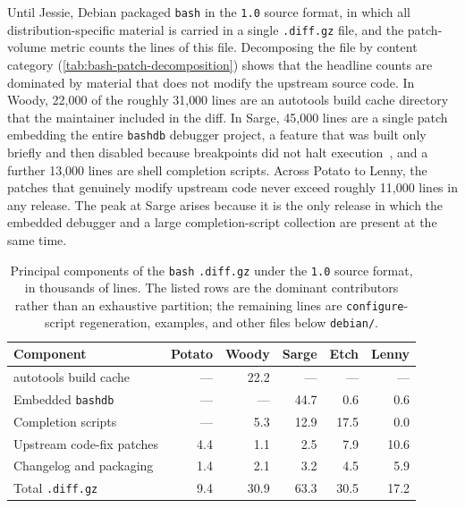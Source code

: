 Until Jessie, Debian packaged \texttt{bash} in the \texttt{1.0} source format, in which all distribution-specific material is carried in a single \texttt{.diff.gz} file, and the patch-volume metric counts the lines of this file. Decomposing the file by content category (\autoref{tab:bash-patch-decomposition}) shows that the headline counts are dominated by material that does not modify the upstream source code. In Woody, 22{,}000 of the roughly 31{,}000 lines are an autotools build cache directory that the maintainer included in the diff. In Sarge, 45{,}000 lines are a single patch embedding the entire \texttt{bashdb} debugger project, a feature that was built only briefly and then disabled because breakpoints did not halt execution~\cite{bts224573}, and a further 13{,}000 lines are shell completion scripts. Across Potato to Lenny, the patches that genuinely modify upstream code never exceed roughly 11{,}000 lines in any release. The peak at Sarge arises because it is the only release in which the embedded debugger and a large completion-script collection are present at the same time.

\begin{table}[ht]
  \centering
  \caption[Principal components of the \texttt{bash} \texttt{.diff.gz}.]{Principal components of the \texttt{bash} \texttt{.diff.gz} under the \texttt{1.0} source format, in thousands of lines. The listed rows are the dominant contributors rather than an exhaustive partition; the remaining lines are \texttt{configure}-script regeneration, examples, and other files below \texttt{debian/}.}
  \label{tab:bash-patch-decomposition}
  \begin{tabular}{lrrrrr}
    \hline
    Component & Potato & Woody & Sarge & Etch & Lenny \\
    \hline
    autotools build cache        & ---  & 22.2 & ---  & ---  & ---  \\
    Embedded \texttt{bashdb}      & ---  & ---  & 44.7 & 0.6  & 0.6  \\
    Completion scripts            & ---  & 5.3  & 12.9 & 17.5 & 0.0  \\
    Upstream code-fix patches     & 4.4  & 1.1  & 2.5  & 7.9  & 10.6 \\
    Changelog and packaging       & 1.4  & 2.1  & 3.2  & 4.5  & 5.9  \\
    \hline
    Total \texttt{.diff.gz}       & 9.4  & 30.9 & 63.3 & 30.5 & 17.2 \\
    \hline
  \end{tabular}
\end{table}


